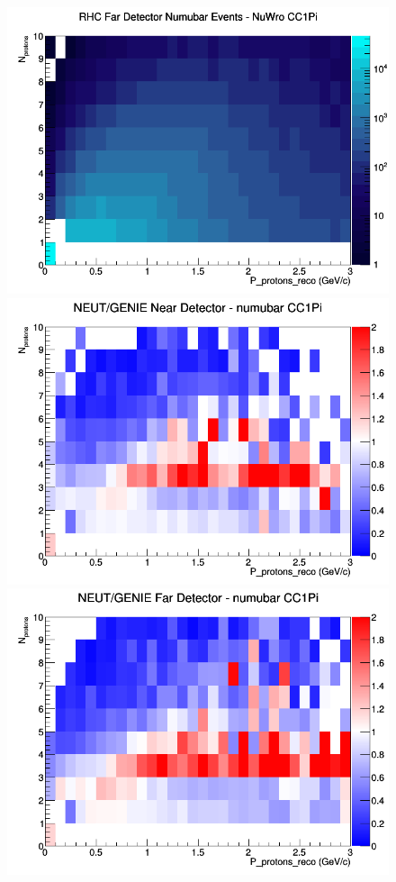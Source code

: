 \begin{figure}[h]
\endminipage
{}
\includegraphics[width=\linewidth]{eff_N_P/LAr/protons/CC1Pi_RHC_FD_numubar_N_P_NuWro.png}
\endminipage
\newline
{}
\includegraphics[width=\linewidth]{eff_N_P/LAr/protons/ratios/CC1Pi_NEUT_GENIE_numubar_near_N_P.png}
\endminipage
{}
\includegraphics[width=\linewidth]{eff_N_P/LAr/protons/ratios/CC1Pi_NEUT_GENIE_numubar_far_N_P.png}

\end{figure}

